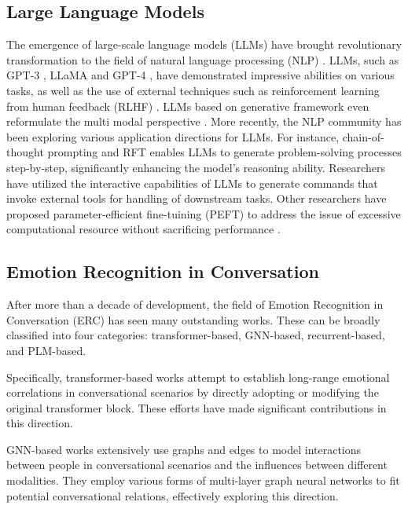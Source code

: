 \documentclass[conference]{IEEEtran}
\begin{document}
\subsection{Large Language Models}
The emergence of large-scale language models (LLMs) have brought revolutionary transformation to the field of natural language processing (NLP) \cite{shen2023hugginggpt}. LLMs, such as GPT-3 \cite{brown2020language}, LLaMA \cite{touvron2023llama} and GPT-4 \cite{openai2023gpt4}, have demonstrated impressive abilities on various tasks, as well as the use of external techniques such as reinforcement learning from human feedback (RLHF) \cite{ouyang2022training}. LLMs based on generative framework even reformulate the multi modal perspective \cite{10.1145/3447548.3467206,zhang-etal-2023-pay}. More recently, the NLP community has been exploring various application directions for LLMs. For instance, chain-of-thought prompting and RFT \cite{wei2023chainofthought,yuan2023scaling} enables LLMs to generate problem-solving processes step-by-step, significantly enhancing the model's reasoning ability. Researchers have utilized the interactive capabilities of LLMs to generate commands that invoke external tools for handling of downstream tasks\cite{shen2023hugginggpt}. 
Other researchers have proposed parameter-efficient fine-tuining (PEFT) to address the issue of excessive computational resource without sacrificing performance \cite{hu2021lora}. 

\subsection{Emotion Recognition in Conversation}










After more than a decade of development, the field of Emotion Recognition in Conversation (ERC) has seen many outstanding works. These can be broadly classified into four categories: transformer-based, GNN-based, recurrent-based, and PLM-based.

Specifically, transformer-based works \cite{li2020multi,song2022supervised,liu2023hierarchical,yingjian2023emotionic,chudasama2022m2fnet} attempt to establish long-range emotional correlations in conversational scenarios by directly adopting or modifying the original transformer block. These efforts have made significant contributions in this direction.

GNN-based works \cite{ghosal2019dialoguegcn,ishiwatari2020relation,shen2021directed,li2023graphcfc} extensively use graphs and edges to model interactions between people in conversational scenarios and the influences between different modalities. They employ various forms of multi-layer graph neural networks to fit potential conversational relations, effectively exploring this direction.
\end{document}
